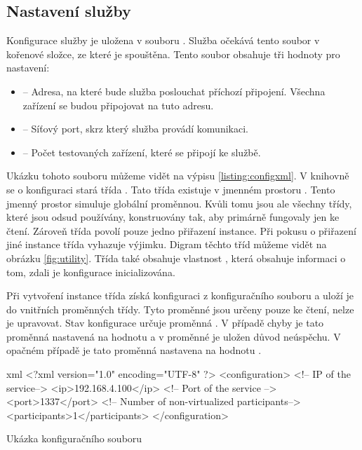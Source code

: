 \subsection{Nastavení služby}\label{sec:settings}

Konfigurace služby je uložena v souboru . Služba očekává tento soubor v kořenové složce, ze které je spouštěna. Tento soubor obsahuje tři hodnoty pro nastavení:

\begin{itemize}
    \item {} -- Adresa, na které bude služba poslouchat příchozí připojení. Všechna zařízení se budou připojovat na tuto adresu.
    \item {} -- Síťový port, skrz který služba provádí komunikaci.
    \item {} -- Počet testovaných zařízení, které se připojí ke službě.   
\end{itemize}

Ukázku tohoto souboru můžeme vidět na výpisu \ref{listing:configxml}. V knihovně se o konfiguraci stará třída . Tato třída existuje v jmenném prostoru . Tento jmenný prostor simuluje globální proměnnou. Kvůli tomu jsou ale všechny třídy, které jsou odsud používány, konstruovány tak, aby primárně fungovaly jen ke čtení. Zároveň třída  povolí pouze jedno přiřazení instance. Při pokusu o přiřazení jiné instance třída vyhazuje výjimku. Digram těchto tříd můžeme vidět na obrázku \ref{fig:utility}. Třída také obsahuje vlastnost , která obsahuje informaci o tom, zdali je konfigurace inicializována.

Při vytvoření instance třída získá konfiguraci z konfiguračního souboru a uloží je do vnitřních proměnných třídy. Tyto proměnné jsou určeny pouze ke čtení, nelze je upravovat. Stav konfigurace určuje proměnná . V případě chyby je tato proměnná nastavená na hodnotu  a v proměnné  je uložen důvod neúspěchu. V opačném případě je tato proměnná nastavena na hodnotu .

\begin{listing}[htbp]
    \centering
    \begin{cminted}{xml}
<?xml version="1.0" encoding="UTF-8" ?>
<configuration>
  <!-- IP of the service-->
  <ip>192.168.4.100</ip>
  <!-- Port of the service -->
  <port>1337</port>
  <!-- Number of non-virtualized participants-->
  <participants>1</participants>
</configuration>
    \end{cminted}
    \caption{Ukázka konfiguračního souboru}
    \label{listing:configxml}
\end{listing}


